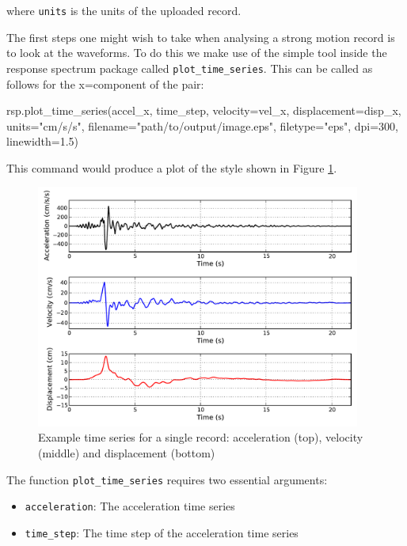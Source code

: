 \noindent where \verb=units= is the units of the uploaded record. 

\noindent The first steps one might wish to take when analysing a strong motion record is to look at the waveforms. To do this we make use of the simple tool inside the response spectrum package called \verb=plot_time_series=.
This can be called as follows for the x=component of the pair:

\begin{python}[frame=single]
rsp.plot_time_series(accel_x,
                     time_step,
                     velocity=vel_x,
                     displacement=disp_x,
                     units="cm/s/s",
                     filename="path/to/output/image.eps",
                     filetype="eps",
                     dpi=300,
                     linewidth=1.5) 
\end{python}

This command would produce a plot of the style shown in Figure \ref{fig:time_series}.

\begin{figure}[htb]
	\centering
		\includegraphics[height=8cm, keepaspectratio=true]{./figures/ims/timeseries_plot1.pdf}
	\caption{Example time series for a single record: acceleration (top), velocity (middle) and displacement (bottom)}
	\label{fig:time_series}
\end{figure}

\noindent The function \verb=plot_time_series= requires two essential arguments: 
\begin{itemize}
\item \verb=acceleration=: The acceleration time series
\item \verb=time_step=: The time step of the acceleration time series
\end{itemize}

